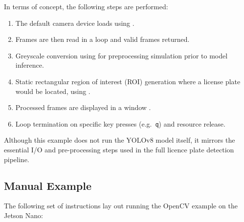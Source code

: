 In terms of concept, the following steps are performed:
\begin{enumerate}
	\item The default camera device loads using .
	\item Frames are then read in a loop and valid frames returned. 
	\item Greyscale conversion using  for preprocessing simulation prior to model inference.
	\item Static rectangular region of interest (ROI) generation where a license plate would be located, using .
	\item Processed frames are displayed in a window .
	\item Loop termination on specific key presses (e.g.\ \texttt{q}) and resource release.
\end{enumerate}

Although this example does not run the YOLOv8 model itself, it mirrors the essential I/O and pre-processing steps used in the full licence plate detection pipeline.


\subsection{Manual Example}

The following set of instructions lay out running the OpenCV example on the Jetson Nano:

